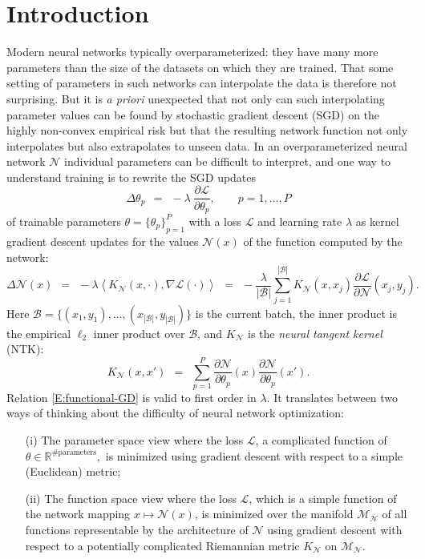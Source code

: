 \documentclass[11pt, reqno]{amsart}
\newcommand{\leb}{\lambda}
\newcommand{\R}{{\mathbb R}}
\newcommand{\abs}[1]{\ensuremath{\left| #1 \right|}}
\newcommand{\inprod}[2]{\ensuremath{\left\langle#1,#2\right\rangle}}
\newcommand{\set}[1]{\ensuremath{\{#1\}}}
\newcommand{\mN}{\mathcal N}
\newcommand{\mM}{\mathcal M}
\begin{document}
\section{Introduction}
Modern neural networks typically overparameterized: they have many more parameters than the size of the datasets on which they are trained. That some setting of parameters in such networks can interpolate the data is therefore not surprising. But it is \textit{a priori} unexpected that not only can such interpolating parameter values can be found by stochastic gradient descent (SGD) on the highly non-convex empirical risk but that the resulting network function not only interpolates but also extrapolates to unseen data. In an overparameterized neural network $\mN$ individual parameters can be difficult to interpret, and one way to understand training is to rewrite the SGD updates
\[\Delta \theta_p ~~=~~ -\leb ~\frac{\partial \mathcal L}{ \partial \theta_p},\qquad p=1,\ldots, P\]
of trainable parameters $\theta=\set{\theta_p}_{p=1}^P$ with a loss $\mathcal L$ and learning rate $\leb$ as kernel gradient descent updates for the values $\mN(x)$ of the function computed by the network:
\begin{equation}\label{E:functional-GD}
\Delta \mN(x)~~=~~-\leb \inprod{K_{\mN}(x,\cdot)}{\nabla \mathcal L (\cdot)}~~=~~-\frac{\leb}{\abs{\mathcal B}}\sum_{j=1}^{\abs{\mathcal B}} K_{\mN}(x,x_j) \frac{\partial \mathcal L}{\partial \mN}(x_j,y_j).
\end{equation}
Here $\mathcal B = \set{(x_1,y_1),\ldots, (x_{\abs{\mathcal B}},y_{\abs{\mathcal B}})}$ is the current batch, the inner product is the empirical $\ell_2$ inner product over $\mathcal B$, and $K_{\mN}$ is the \textit{neural tangent kernel} (NTK):
\[K_{\mN}(x,x')~~=~~\sum_{p=1}^P \frac{\partial \mN}{\partial \theta_p}(x)\frac{\partial \mN}{\partial \theta_p}(x').\]
Relation \eqref{E:functional-GD} is valid to first order in $\lambda.$ It translates between two ways of thinking about the difficulty of neural network optimization:
\begin{enumerate}
\item[(i)] The parameter space view where the loss $\mathcal L$, a complicated function of $\theta\in \R^{\#\text{parameters}},$ is minimized using gradient descent with respect to a simple (Euclidean) metric;
\item[(ii)] The function space view where the loss $\mathcal L$, which is a simple function of the network mapping $x\mapsto \mN(x)$, is minimized over the manifold $\mM_{\mN}$ of all functions representable by the architecture of $\mN$ using gradient descent with respect to a potentially complicated Riemannian metric $K_{\mN}$ on $\mM_{\mN}.$
\end{enumerate}
\end{document}
